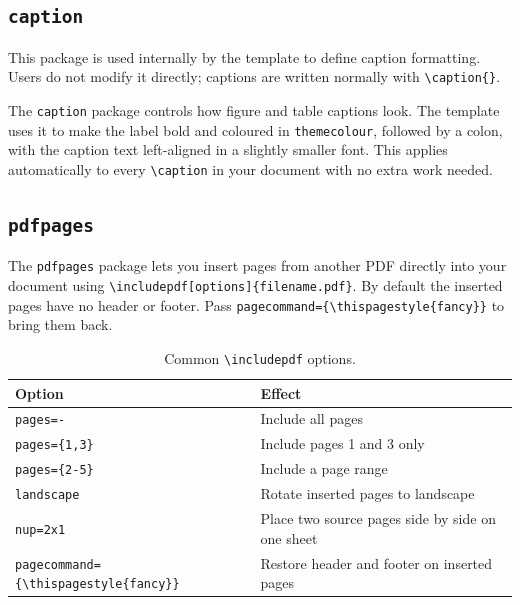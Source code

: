 \subsection{\texttt{caption}}
\noindent\colorbox{themecolour!15}{\parbox{\linewidth}{\small This package is used internally by the template to define caption formatting. Users do not modify it directly; captions are written normally with \texttt{\textbackslash caption\{\}}.}}\vspace{0.5\baselineskip}

The \texttt{caption} package controls how figure and table captions look. The template uses it to make the label bold and coloured in \texttt{themecolour}, followed by a colon, with the caption text left-aligned in a slightly smaller font. This applies automatically to every \texttt{\textbackslash caption} in your document with no extra work needed.

\subsection{\texttt{pdfpages}}
The \texttt{pdfpages} package lets you insert pages from another PDF directly into your document using \texttt{\textbackslash includepdf[options]\{filename.pdf\}}. By default the inserted pages have no header or footer. Pass \texttt{pagecommand=\{\textbackslash thispagestyle\{fancy\}\}} to bring them back.

\begin{table}[H]
	\centering
	\caption{Common \texttt{\textbackslash includepdf} options.}
	\label{tab:pdfpages}
	\begin{tabularx}{\linewidth}{@{}lX@{}}
		\toprule
		Option & Effect \\
		\midrule
		\texttt{pages=-}        & Include all pages \\
		\texttt{pages=\{1,3\}}  & Include pages 1 and 3 only \\
		\texttt{pages=\{2-5\}}  & Include a page range \\
		\texttt{landscape}      & Rotate inserted pages to landscape \\
		\texttt{nup=2x1}        & Place two source pages side by side on one sheet \\
		\texttt{pagecommand=\{\textbackslash thispagestyle\{fancy\}\}} & Restore header and footer on inserted pages \\
		\bottomrule
	\end{tabularx}
\end{table}

